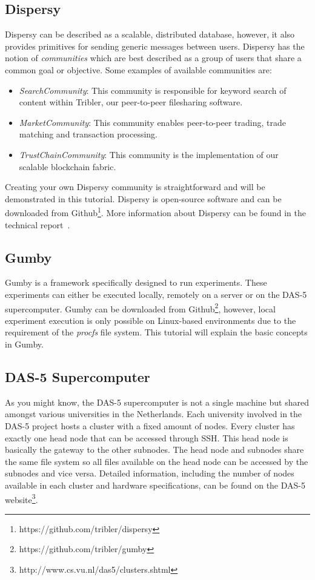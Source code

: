 \documentclass{article}
\begin{document}
\subsection{Dispersy}
Dispersy can be described as a scalable, distributed database, however, it also provides primitives for sending generic messages between users.
Dispersy has the notion of \emph{communities} which are best described as a group of users that share a common goal or objective.
Some examples of available communities are:
\begin{itemize}
	\item \emph{SearchCommunity}: This community is responsible for keyword search of content within Tribler, our peer-to-peer filesharing software.
	\item \emph{MarketCommunity}: This community enables peer-to-peer trading, trade matching and transaction processing.
	\item \emph{TrustChainCommunity}: This community is the implementation of our scalable blockchain fabric.
\end{itemize}

Creating your own Dispersy community is straightforward and will be demonstrated in this tutorial.
Dispersy is open-source software and can be downloaded from Github\footnote{https://github.com/tribler/dispersy}.
More information about Dispersy can be found in the technical report~\cite{zeilemaker2013dispersy}.

\subsection{Gumby}
Gumby is a framework specifically designed to run experiments.
These experiments can either be executed locally, remotely on a server or on the DAS-5 supercomputer.
Gumby can be downloaded from Github\footnote{https://github.com/tribler/gumby}, however, local experiment execution is only possible on Linux-based environments due to the requirement of the \emph{procfs} file system.
This tutorial will explain the basic concepts in Gumby.

\subsection{DAS-5 Supercomputer}
As you might know, the DAS-5 supercomputer is not a single machine but shared amongst various universities in the Netherlands.
Each university involved in the DAS-5 project hosts a cluster with a fixed amount of nodes.
Every cluster has exactly one head node that can be accessed through SSH.
This head node is basically the gateway to the other subnodes.
The head node and subnodes share the same file system so all files available on the head node can be accessed by the subnodes and vice versa.
Detailed information, including the number of nodes available in each cluster and hardware specifications, can be found on the DAS-5 website\footnote{http://www.cs.vu.nl/das5/clusters.shtml}.
\end{document}
